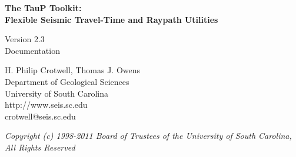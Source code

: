 
\begin{titlepage}
\begin{center}

\vspace{2in}

\LARGE
\textbf{
The TauP Toolkit: \\
Flexible Seismic Travel-Time and Raypath Utilities \\
}

\large
Version 2.3 \\
Documentation 

\vspace{3in}

H. Philip Crotwell, Thomas J. Owens \\
Department of Geological Sciences \\
University of South Carolina \\
http://www.seis.sc.edu \\
crotwell@seis.sc.edu 

\vspace{3in}

\textit{
\normalsize 
Copyright (c) 1998-2011 Board of Trustees of the University of South Carolina, \\
All Rights Reserved
\normalsize}

\end{center}
\end{titlepage}

